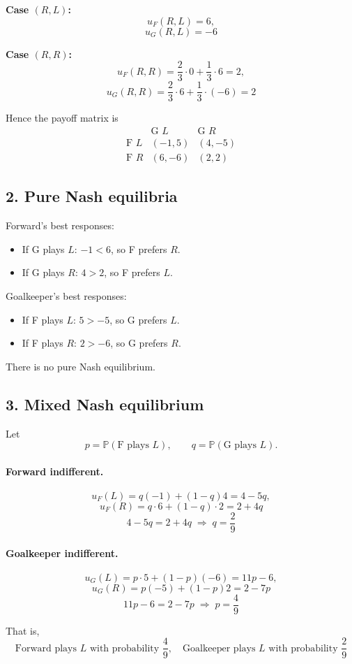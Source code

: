 \textbf{Case $(R,L)$:}
\[
u_F(R,L)=6,
\]
\[
u_G(R,L)=-6
\]

\textbf{Case $(R,R)$:}
\[
u_F(R,R)=\frac{2}{3}\cdot 0 + \frac{1}{3}\cdot 6=2,
\]
\[
u_G(R,R)=\frac{2}{3}\cdot 6 + \frac{1}{3}\cdot(-6)=2
\]

Hence the payoff matrix is
\[
\begin{array}{c|cc}
 & \text{G }L & \text{G }R\\
\hline
\text{F }L & (-1,5) & (4,-5)\\
\text{F }R & (6,-6) & (2,2)
\end{array}
\]

\subsection*{2. Pure Nash equilibria}

Forward's best responses:
\begin{itemize}
\item If G plays $L$: $-1 < 6$, so F prefers $R$.
\item If G plays $R$: $4 > 2$, so F prefers $L$.
\end{itemize}

Goalkeeper's best responses:
\begin{itemize}
\item If F plays $L$: $5 > -5$, so G prefers $L$.
\item If F plays $R$: $2 > -6$, so G prefers $R$.
\end{itemize}

There is no pure Nash equilibrium.

\subsection*{3. Mixed Nash equilibrium}

Let
\[
p=\mathbb{P}(\text{F plays }L), \qquad
q=\mathbb{P}(\text{G plays }L).
\]

\paragraph{Forward indifferent.}
\[
u_F(L)=q(-1)+(1-q)4=4-5q,
\]
\[
u_F(R)=q\cdot 6+(1-q)\cdot 2=2+4q
\]
\[
4-5q=2+4q \;\Rightarrow\; q=\frac{2}{9}
\]

\paragraph{Goalkeeper indifferent.}
\[
u_G(L)=p\cdot 5+(1-p)(-6)=11p-6,
\]
\[
u_G(R)=p(-5)+(1-p)2=2-7p
\]
\[
11p-6=2-7p \;\Rightarrow\; p=\frac{4}{9}
\]

That is,
\[
\text{Forward plays }L\text{ with probability }\frac{4}{9}, \quad
\text{Goalkeeper plays }L\text{ with probability }\frac{2}{9}
\]
